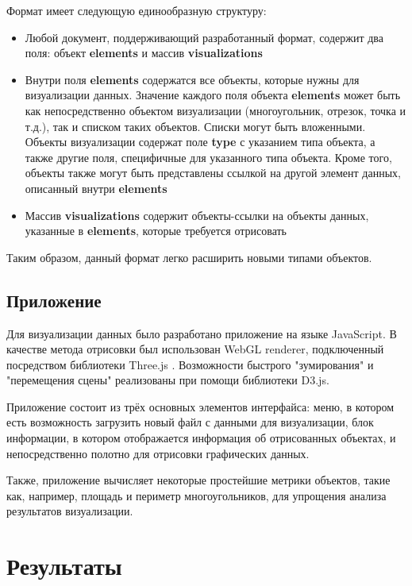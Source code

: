 \documentclass[12pt]{article}
\begin{document}
Формат имеет следующую единообразную структуру: 
\begin{itemize}
	\item Любой документ, поддерживающий разработанный формат, содержит два поля: объект \textbf{elements} и массив \textbf{visualizations}
	\item Внутри поля \textbf{elements} содержатся все объекты, которые нужны для визуализации данных. Значение каждого поля объекта \textbf{elements}  может быть как  непосредственно  объектом визуализации (многоугольник, отрезок, точка и т.д.), так и списком таких объектов. Списки могут быть вложенными. Объекты визуализации содержат поле \textbf{type} с указанием типа объекта, а также другие поля, специфичные для указанного типа объекта. Кроме того, объекты также могут быть представлены ссылкой на другой элемент данных, описанный внутри \textbf{elements}
	\item Массив \textbf{visualizations} содержит объекты-ссылки на объекты данных, указанные в \textbf{elements}, которые требуется отрисовать
\end{itemize}

Таким образом, данный формат легко расширить новыми типами объектов.

\subsection{Приложение}

Для визуализации данных было разработано приложение на языке JavaScript. В качестве метода отрисовки был использован WebGL renderer, подключенный посредством библиотеки Three.js \cite{b5}. Возможности быстрого "зумирования" и "перемещения сцены" реализованы при помощи библиотеки D3.js\cite{b6}. 

Приложение состоит из трёх основных элементов интерфайса: меню, в котором есть возможность загрузить новый файл с данными для визуализации, блок информации, в котором отображается информация об отрисованных объектах, и непосредственно полотно для отрисовки графических данных. 

Также, приложение вычисляет некоторые простейшие метрики объектов, такие как, например, площадь и периметр многоугольников, для упрощения анализа результатов визуализации.

\pagebreak

\section{Результаты}
\end{document}
